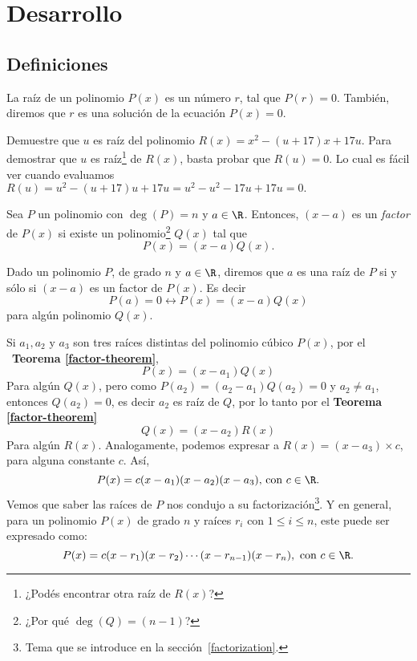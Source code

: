 \section{Desarrollo}\label{sec:desarrollo}

\subsection{Definiciones}
{
    \begin{section-definition}
        La raíz de un polinomio $P(x)$ es un número $r$, tal que $P(r) = 0$. También, diremos que $r$ es una solución de la ecuación $P(x) = 0$.
    \end{section-definition}

    \begin{example}
        Demuestre que $u$ es raíz del polinomio $R(x) = x^2 - (u + 17) x + 17u$.
        \exampleProof
        {
            Para demostrar que $u$ es raíz\footnote{¿Podés encontrar otra raíz de $R(x)$?} de $R(x)$, basta probar que $R(u) = 0$. Lo cual es fácil ver cuando evaluamos $R(u) = u^2 - (u+17)u + 17u = u^2 - u^2 - 17u + 17u = 0.$
        }
    \end{example}


    \begin{section-definition}
        Sea $P$ un polinomio con $\deg{(P)} = n$ y $a \in \R$. Entonces, $(x - a)$ es un \emph{factor} de $P(x)$ si existe un polinomio\footnote{¿Por qué $\deg{(Q)} = (n-1)$?} $Q(x)$ tal que \[P(x) = (x-a)Q(x).\]
    \end{section-definition}

    \begin{theorem}\label{factor-theorem}
        Dado un polinomio $P$, de grado $n$ y $a \in \R$, diremos que $a$ es una raíz de $P$ si y sólo si $(x-a)$ es un factor de $P(x)$. Es decir \[P(a) = 0 \leftrightarrow P(x) = (x-a)Q(x)\] para algún polinomio $Q(x).$
    \end{theorem}

    Si $a_1, a_2 \mbox{ y } a_3$ son tres raíces distintas del polinomio cúbico $P(x)$, por el ~\textbf{Teorema \ref{factor-theorem}}, \[P(x) = (x - a_1)Q(x)\]
    Para algún $Q(x)$, pero como $P(a_2) = (a_2 - a_1)Q(a_2) = 0$ y $a_2 \neq a_1$, entonces $Q(a_2) = 0$, es decir $a_2$ es raíz de $Q$, por lo tanto por el \textbf{Teorema \ref{factor-theorem}} \[Q(x) = (x - a_2)R(x)\]
    Para algún $R(x)$. Analogamente, podemos expresar a $R(x) = (x - a_3)\times c$, para alguna constante $c$. Así, \[P(x) = c(x - a_1)(x - a_2)(x - a_3) \mbox{, con } c \in \R.\]
    Vemos que saber las raíces de $P$ nos condujo a su factorización\footnote{Tema que se introduce en la sección~\ref{factorization}.}. Y en general, para un polinomio $P(x)$ de grado $n$ y raíces $r_i \mbox{ con } 1 \leq i \leq n$, este puede ser expresado como:
    \[P(x) = c(x - r_1)(x - r_2)\cdots(x - r_{n-1})(x - r_n), \mbox{ con } c \in \R.\]

}
